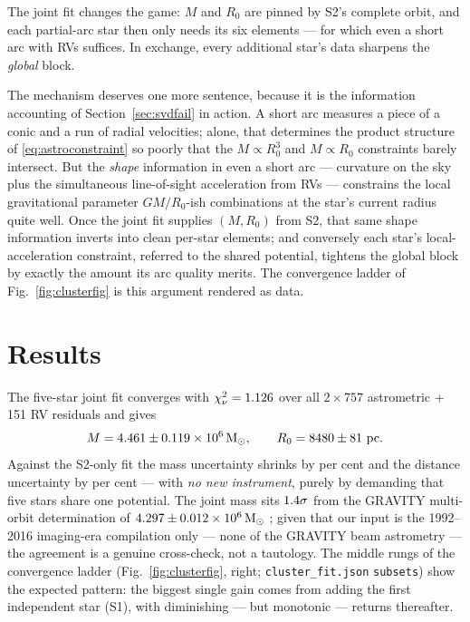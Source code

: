 The joint fit changes the game: $M$ and $R_0$ are pinned by S2's
complete orbit, and each partial-arc star then only needs its six
elements — for which even a short arc with RVs suffices. In exchange,
every additional star's data sharpens the \emph{global} block.

The mechanism deserves one more sentence, because it is the
information accounting of Section~\ref{sec:svdfail} in action. A short
arc measures a piece of a conic and a run of radial velocities; alone,
that determines the product structure of \eqref{eq:astroconstraint}
so poorly that the $M \propto R_0^3$ and $M \propto R_0$ constraints
barely intersect. But the \emph{shape} information in even a short arc
— curvature on the sky plus the simultaneous line-of-sight
acceleration from RVs — constrains the local gravitational parameter
$GM/R_0$-ish combinations at the star's current radius quite well.
Once the joint fit supplies $(M, R_0)$ from S2, that same shape
information inverts into clean per-star elements; and conversely each
star's local-acceleration constraint, referred to the shared
potential, tightens the global block by exactly the amount its arc
quality merits. The convergence ladder of
Fig.~\ref{fig:clusterfig} is this argument rendered as data.

\section{Results}
\label{sec:clusterresults}

The five-star joint fit converges with
$\chi^2_\nu = 1.126$ over all
$2\times757$ astrometric + 151 RV residuals and gives
\begin{equation}
M = 4.461 \pm 0.119 \times 10^{6}\,\mathrm{M}_\odot,
\qquad
R_0 = 8480 \pm 81~\mathrm{pc}.
\end{equation}
Against the S2-only fit the mass uncertainty shrinks by
\ClusterMassImprovePct{} per cent and the distance uncertainty by
\ClusterDistImprovePct{} per cent — with \emph{no new instrument},
purely by demanding that five stars share one potential. The joint mass
sits $1.4\sigma$ from the GRAVITY multi-orbit
determination of $4.297\pm0.012\times10^6\,\mathrm{M}_\odot$ \citep{Gravity2022};
given that our input is the 1992--2016 imaging-era compilation only —
none of the GRAVITY beam astrometry — the agreement is a genuine
cross-check, not a tautology. The middle rungs of the convergence
ladder (Fig.~\ref{fig:clusterfig}, right; \texttt{cluster\_fit.json}
\texttt{subsets}) show the expected pattern: the biggest single gain
comes from adding the first independent star (S1), with diminishing —
but monotonic — returns thereafter.

